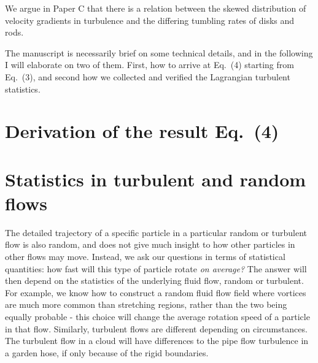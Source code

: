 \documentclass[thesis.tex]{subfiles}
\begin{document}
We argue in Paper C that there is a relation between the skewed distribution of velocity gradients in turbulence and the differing tumbling rates of disks and rods.


The manuscript is necessarily brief on some technical details, and in the following I will elaborate on two of them. First, how to arrive at Eq.~(4) starting from Eq.~(3), and second how we collected and verified the Lagrangian turbulent statistics.

\section{Derivation of the result Eq.~(4)}



\section{Statistics in turbulent and random flows}

The detailed trajectory of a specific particle in a particular random or turbulent flow is also random, and does not give much insight to how other particles in other flows may move. Instead, we ask our questions in terms of statistical quantities: how fast will this type of particle rotate \emph{on average?} The answer will then depend on the statistics of the underlying fluid flow, random or turbulent. For example, we know how to construct a random fluid flow field where vortices are much more common than stretching regions, rather than the two being equally probable - this choice will change the average rotation speed of a particle in that flow. Similarly, turbulent flows are different depending on circumstances. The turbulent flow in a cloud will have differences to the pipe flow turbulence in a garden hose, if only because of the rigid boundaries.
\end{document}
